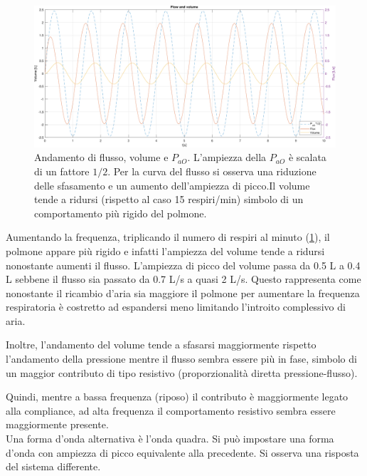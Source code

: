 \begin{figure}[t!]
\label{fig:sine_wave_15}
	\centering
\includegraphics[width=0.95\linewidth]{../model/data_log/data_sine_wave_freq_45_zoom.pdf}
\caption{Andamento di flusso, volume e $P_{aO}$. L'ampiezza della $P_{aO}$ è scalata di un fattore $1/2$. Per la curva del flusso si osserva una riduzione delle sfasamento e un aumento dell'ampiezza di picco.Il volume tende a ridursi (rispetto al caso 15 respiri/min) simbolo di un comportamento più rigido del polmone.}
\label{fig:sine_wave_45}
\end{figure}

Aumentando la frequenza, triplicando il numero di respiri al minuto (\cref{fig:sine_wave_45}), il polmone appare più rigido e infatti l'ampiezza del volume tende a ridursi nonostante aumenti il flusso. L'ampiezza di picco del volume passa da 0.5 L a 0.4 L sebbene il flusso sia passato da 0.7 L/s a quasi 2 L/s. Questo rappresenta come nonostante il ricambio d'aria sia maggiore il polmone per aumentare la frequenza respiratoria è costretto ad espandersi meno limitando l'introito complessivo di aria.   

Inoltre, l'andamento del volume tende a sfasarsi maggiormente rispetto l'andamento della pressione mentre il flusso sembra essere più in fase, simbolo di un maggior contributo di tipo resistivo (proporzionalità diretta pressione-flusso).

Quindi, mentre a bassa frequenza (riposo) il contributo è maggiormente legato alla compliance, ad alta frequenza il comportamento resistivo sembra essere maggiormente presente.
\\

Una forma d'onda alternativa è l'onda quadra. Si può impostare una forma d'onda con ampiezza di picco equivalente alla precedente. Si osserva una risposta del sistema differente.

